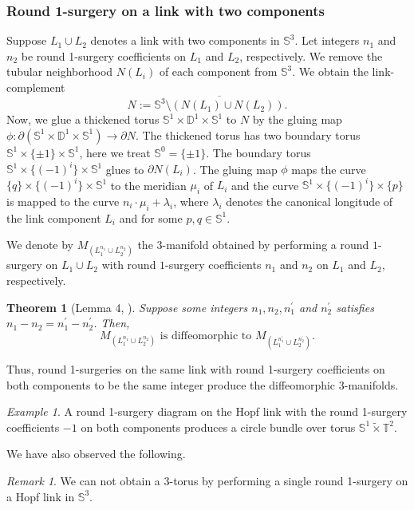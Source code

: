 \documentclass{amsart}
\theoremstyle{plain}
\newtheorem{thm}{Theorem}
\theoremstyle{remark}
\newtheorem{rem}{Remark}
\newtheorem{exm}{Example}
\theoremstyle{definition}
\newcommand{\s}{\mathbb{S}}
\newcommand{\D}{\mathbb{D}}
\newcommand{\dd}{\partial}
\begin{document}
\subsubsection{Round 1-surgery on a link with two components}
Suppose $L_1\cup L_2$ denotes a link with two components in $\s^3$. Let integers $n_1$ and $n_2$ be round 1-surgery coefficients on $L_1$ and $L_2$, respectively.  
We remove the tubular neighborhood $N(L_i)$ of each component from $\s^3$. We obtain the link-complement $$N:=\overline{\s^3\setminus(N(L_1)\cup N(L_2))}.$$ 
Now, we glue a thickened torus $\s^1 \times \D^1\times \s^1$ to $N$ by the gluing map $\phi: \dd(\s^1 \times \D^1 \times \s^1) \to \dd N$.  
The thickened torus has two boundary torus $\s^1 \times \{\pm1\}\times \s^1$, here we treat $\s^0 = \{\pm1\}$.
The boundary torus $\s^1 \times \{(-1)^i\} \times \s^1$ glues to $\partial N(L_i)$. 
The gluing map $\phi$ maps the curve $\{q\} \times \{(-1)^i\} \times \s^1$ to the meridian $\mu_i$ of $L_i$ and the curve $\s^1 \times \{(-1)^i\} \times \{p\}$ is mapped to the curve $n_i \cdot \mu_i + \lambda_i$, where $\lambda_i$ denotes the canonical longitude of the link component $L_i$ and for some $p,q \in \s^1$.

We denote by $M_{(L^{n_1}_1 \cup L^{n_2}_2)}$ the $3$-manifold obtained by performing a round $1$-surgery on $L_1 \cup L_2$ with round $1$-surgery coefficients $n_1$ and $n_2$ on $L_1$ and $L_2$, respectively.


\begin{thm}[Lemma 4, \cite{PD-RSD}]\label{thm: SameClassOfR1SD}
Suppose some integers $n_1, n_2, n^{\prime}_1$ and $n^{\prime}_2$ satisfies $n_1-n_2 = n_1^{\prime}-n^{\prime}_2$. Then,
$$M_{(L_1^{n_1}\cup L_2^{n_2})}\text{ is diffeomorphic to } M_{(L_1^{n^{\prime}_1}\cup L_2^{n^{\prime}_2})}.$$ \end{thm}

Thus, round 1-surgeries on the same link with round 1-surgery coefficients on both components to be the same integer produce the diffeomorphic 3-manifolds.

\begin{exm}\label{exm: R1SD}
A round 1-surgery diagram on the Hopf link with the round 1-surgery coefficients $-1$ on both components produces a circle bundle over torus $\s^1 \tilde{\times} \mathbb{T}^2$.
\end{exm}

We have also observed the following. 

\begin{rem}
We can not obtain a 3-torus by performing a single round 1-surgery on a Hopf link in $\s^3$. 
\end{rem}
\end{document}
